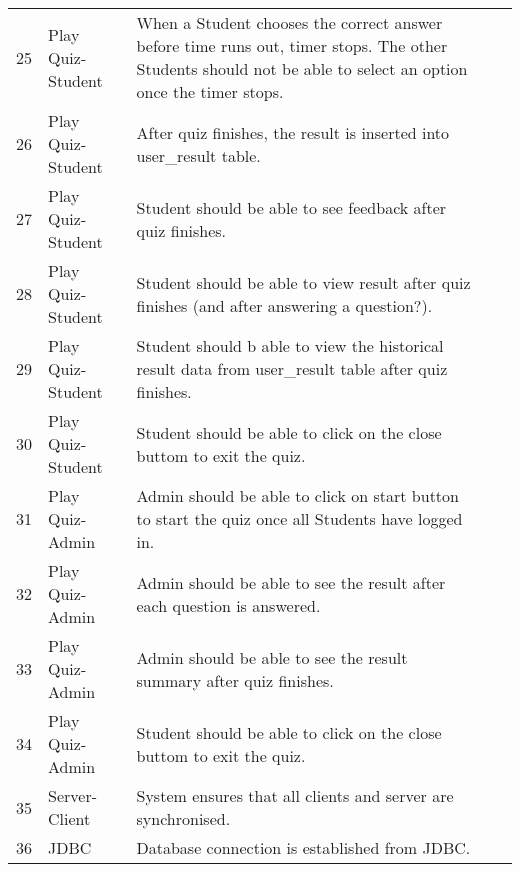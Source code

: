 \begin{landscape}
\begin{longtabu}{c l X c c}
25 & Play Quiz-Student & When a Student chooses the correct answer before time
runs out, timer stops. The other Students should not be able to select an
option once the timer stops. & & \\

26 & Play Quiz-Student & After quiz finishes, the result is inserted into
user\_result table. & & \\

27 & Play Quiz-Student & Student should be able to see feedback after quiz
finishes. & & \\

28 & Play Quiz-Student & Student should be able to view result after quiz
finishes (and after answering a question?). & & \\

29 & Play Quiz-Student & Student should b able to view the historical result
data from user\_result table after quiz finishes. & & \\

30 & Play Quiz-Student & Student should be able to click on the close buttom to
exit the quiz. & & \\

31 & Play Quiz-Admin & Admin should be able to click on start button to start
the quiz once all Students have logged in. & & \\

32 & Play Quiz-Admin & Admin should be able to see the result after each
question is answered. & & \\

33 & Play Quiz-Admin & Admin should be able to see the result summary after
quiz finishes. & & \\

34 & Play Quiz-Admin & Student should be able to click on the close buttom to
exit the quiz. & & \\

35 & Server-Client & System ensures that all clients and server are
synchronised. & & \\

36 & JDBC & Database connection is established from JDBC\@. & & \\
\bottomrule
\end{longtabu}
\end{landscape}
\restoregeometry%
